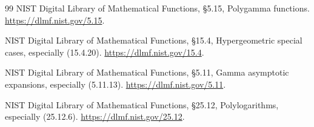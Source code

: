 \documentclass[11pt,letterpaper]{article}
\theoremstyle{definition}
\theoremstyle{remark}
\numberwithin{equation}{section}
\begin{document}
\begin{thebibliography}{99}
NIST Digital Library of Mathematical Functions,
\S5.15, Polygamma functions.
\url{https://dlmf.nist.gov/5.15}.

NIST Digital Library of Mathematical Functions,
\S15.4, Hypergeometric special cases, especially (15.4.20).
\url{https://dlmf.nist.gov/15.4}.

NIST Digital Library of Mathematical Functions,
\S5.11, Gamma asymptotic expansions, especially (5.11.13).
\url{https://dlmf.nist.gov/5.11}.

NIST Digital Library of Mathematical Functions,
\S25.12, Polylogarithms, especially (25.12.6).
\url{https://dlmf.nist.gov/25.12}.
\end{thebibliography}

\end{document}
